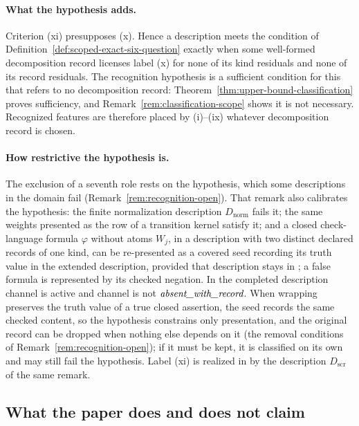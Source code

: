 \paragraph{What the hypothesis adds.} Criterion (xi) presupposes (x). Hence a description meets the condition of Definition~\ref{def:scoped-exact-six-question} exactly when some well-formed decomposition record licenses label (x) for none of its kind residuals and none of its record residuals. The recognition hypothesis is a sufficient condition for this that refers to no decomposition record: Theorem~\ref{thm:upper-bound-classification} proves sufficiency, and Remark~\ref{rem:classification-scope} shows it is not necessary. Recognized features are therefore placed by (i)--(ix) whatever decomposition
record is chosen.

\paragraph{How restrictive the hypothesis is.} The exclusion of a seventh role rests
on the hypothesis, which some descriptions in the domain fail
(Remark~\ref{rem:recognition-open}). That remark also calibrates the
hypothesis: the finite normalization description \(D_{\mathrm{norm}}\) fails it;
the same weights presented as the row of a transition kernel satisfy it; and a closed check-language formula \(\varphi\) without atoms \(W_j\), in a description with two distinct declared records of one kind, can be re-presented as a covered \Ptwo{} seed recording its truth value in the extended description, provided that description stays in \FATCD{}; a false formula is represented by its checked negation. In the completed description channel \Ptwo{} is active and channel \Pfive{} is not \(\textit{absent\_\allowbreak with\_\allowbreak record}\). When wrapping preserves the truth value of a true closed assertion, the seed records the same checked content, so the hypothesis constrains only presentation, and the
original record can be dropped when nothing else depends on it (the removal
conditions of Remark~\ref{rem:recognition-open}); if it must be kept, it is
classified on its own and may still fail the hypothesis. Label (xi) is realized in \FATCD{} by the
description \(D_{\mathrm{scr}}\) of the same remark.

\subsection{What the paper does and does not claim}\label{subsec:intro-nonclaims}


